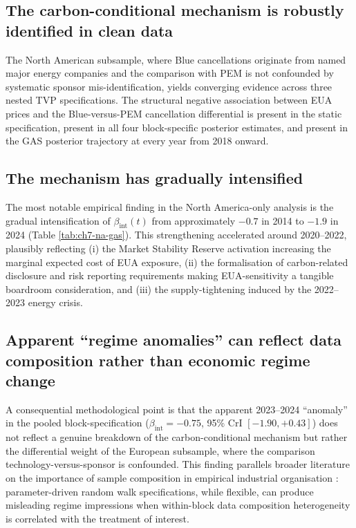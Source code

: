 \documentclass[11pt,a4paper]{article}
\newcommand{\bint}{\beta_{\mathrm{int}}}
\begin{document}
\subsection{The carbon-conditional mechanism is robustly identified in clean data}

The North American subsample, where Blue cancellations originate from named major energy companies and the comparison with PEM is not confounded by systematic sponsor mis-identification, yields converging evidence across three nested TVP specifications. The structural negative association between EUA prices and the Blue-versus-PEM cancellation differential is present in the static specification, present in all four block-specific posterior estimates, and present in the GAS posterior trajectory at every year from 2018 onward.

\subsection{The mechanism has gradually intensified}

The most notable empirical finding in the North America-only analysis is the gradual intensification of $\bint(t)$ from approximately $-0.7$ in 2014 to $-1.9$ in 2024 (Table \ref{tab:ch7-na-gas}). This strengthening accelerated around 2020--2022, plausibly reflecting (i) the Market Stability Reserve activation increasing the marginal expected cost of EUA exposure, (ii) the formalisation of carbon-related disclosure and risk reporting requirements making EUA-sensitivity a tangible boardroom consideration, and (iii) the supply-tightening induced by the 2022--2023 energy crisis.

\subsection{Apparent ``regime anomalies'' can reflect data composition rather than economic regime change}

A consequential methodological point is that the apparent 2023--2024 ``anomaly'' in the pooled block-specification ($\bint = -0.75$, 95\% CrI $[-1.90, +0.43]$) does not reflect a genuine breakdown of the carbon-conditional mechanism but rather the differential weight of the European subsample, where the comparison technology-versus-sponsor is confounded. This finding parallels broader literature on the importance of sample composition in empirical industrial organisation \citep{durbin2012time}: parameter-driven random walk specifications, while flexible, can produce misleading regime impressions when within-block data composition heterogeneity is correlated with the treatment of interest.
\end{document}
